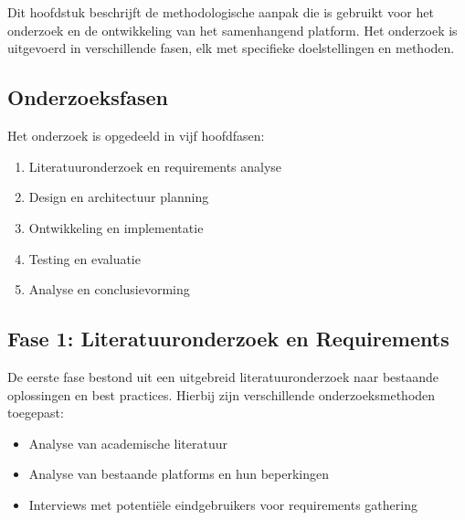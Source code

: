 
\chapter{}
\label{ch:methodologie}

Dit hoofdstuk beschrijft de methodologische aanpak die is gebruikt voor het onderzoek en de ontwikkeling van het samenhangend platform. Het onderzoek is uitgevoerd in verschillende fasen, elk met specifieke doelstellingen en methoden.

\section{Onderzoeksfasen}
\label{sec:onderzoeksfasen}

Het onderzoek is opgedeeld in vijf hoofdfasen:

\begin{enumerate}
    \item Literatuuronderzoek en requirements analyse
    \item Design en architectuur planning
    \item Ontwikkeling en implementatie
    \item Testing en evaluatie
    \item Analyse en conclusievorming
\end{enumerate}

\section{Fase 1: Literatuuronderzoek en Requirements}
\label{sec:fase1}

De eerste fase bestond uit een uitgebreid literatuuronderzoek naar bestaande oplossingen en best practices. Hierbij zijn verschillende onderzoeksmethoden toegepast:

\begin{itemize}
    \item Analyse van academische literatuur
    \item Analyse van bestaande platforms en hun beperkingen
    \item Interviews met potentiële eindgebruikers voor requirements gathering
\end{itemize}

